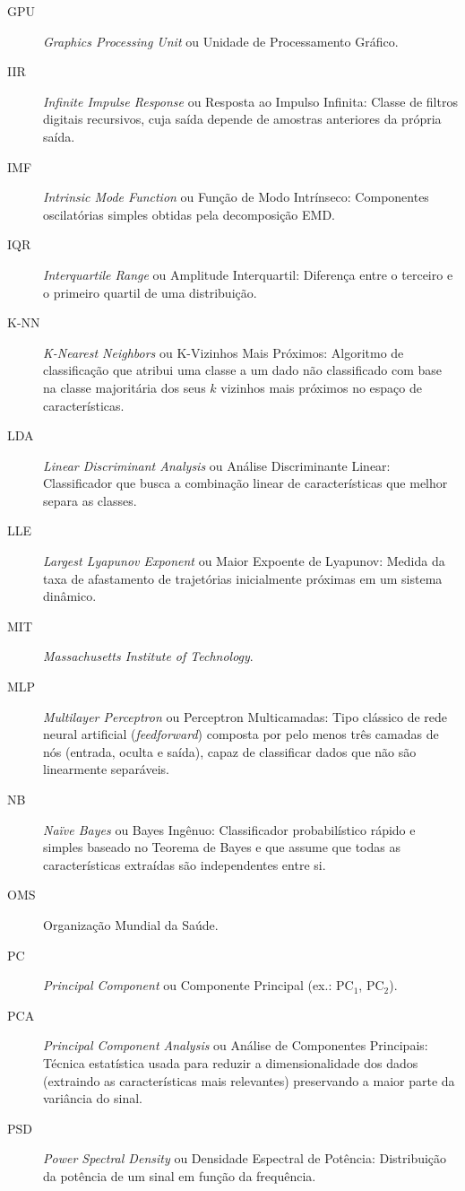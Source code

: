 \documentclass[]{article}
\begin{document}
\begin{description}
		\item[GPU] \textit{Graphics Processing Unit} ou Unidade de Processamento Gráfico.
		\item[IIR] \textit{Infinite Impulse Response} ou Resposta ao Impulso Infinita: Classe de filtros digitais recursivos, cuja saída depende de amostras anteriores da própria saída.
		\item[IMF] \textit{Intrinsic Mode Function} ou Função de Modo Intrínseco: Componentes oscilatórias simples obtidas pela decomposição EMD.
		\item[IQR] \textit{Interquartile Range} ou Amplitude Interquartil: Diferença entre o terceiro e o primeiro quartil de uma distribuição.
		\item[K-NN] \textit{K-Nearest Neighbors} ou K-Vizinhos Mais Próximos: Algoritmo de classificação que atribui uma classe a um dado não classificado com base na classe majoritária dos seus $k$ vizinhos mais próximos no espaço de características.
		\item[LDA] \textit{Linear Discriminant Analysis} ou Análise Discriminante Linear: Classificador que busca a combinação linear de características que melhor separa as classes.
		\item[LLE] \textit{Largest Lyapunov Exponent} ou Maior Expoente de Lyapunov: Medida da taxa de afastamento de trajetórias inicialmente próximas em um sistema dinâmico.
		\item[MIT] \textit{Massachusetts Institute of Technology}.
		\item[MLP] \textit{Multilayer Perceptron} ou Perceptron Multicamadas: Tipo clássico de rede neural artificial (\textit{feedforward}) composta por pelo menos três camadas de nós (entrada, oculta e saída), capaz de classificar dados que não são linearmente separáveis.
		\item[NB] \textit{Naïve Bayes} ou Bayes Ingênuo: Classificador probabilístico rápido e simples baseado no Teorema de Bayes e que assume que todas as características extraídas são independentes entre si.
		\item[OMS] Organização Mundial da Saúde.
		\item[PC] \textit{Principal Component} ou Componente Principal (ex.: $\text{PC}_1$, $\text{PC}_2$).
		\item[PCA] \textit{Principal Component Analysis} ou Análise de Componentes Principais: Técnica estatística usada para reduzir a dimensionalidade dos dados (extraindo as características mais relevantes) preservando a maior parte da variância do sinal.
		\item[PSD] \textit{Power Spectral Density} ou Densidade Espectral de Potência: Distribuição da potência de um sinal em função da frequência.

\end{description}
\end{document}
